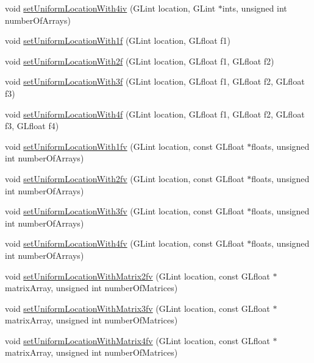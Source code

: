 \begin{DoxyCompactItemize}
\item 
void \hyperlink{classGLProgram_a8d7620f14405cd3fb99d83886ef15775}{set\+Uniform\+Location\+With4iv} (G\+Lint location, G\+Lint $\ast$ints, unsigned int number\+Of\+Arrays)
\item 
void \hyperlink{classGLProgram_a1ad9ce5ccc8d957fe9e01d71ce9560f2}{set\+Uniform\+Location\+With1f} (G\+Lint location, G\+Lfloat f1)
\item 
void \hyperlink{classGLProgram_a3b762779b30cea82590314538843db9a}{set\+Uniform\+Location\+With2f} (G\+Lint location, G\+Lfloat f1, G\+Lfloat f2)
\item 
void \hyperlink{classGLProgram_a33e41cd80fb48e0a57b471f35169783a}{set\+Uniform\+Location\+With3f} (G\+Lint location, G\+Lfloat f1, G\+Lfloat f2, G\+Lfloat f3)
\item 
void \hyperlink{classGLProgram_aae6350415e7f86969daa6de160859cf3}{set\+Uniform\+Location\+With4f} (G\+Lint location, G\+Lfloat f1, G\+Lfloat f2, G\+Lfloat f3, G\+Lfloat f4)
\item 
void \hyperlink{classGLProgram_adeb93361bb46fed7496618d46cd2c176}{set\+Uniform\+Location\+With1fv} (G\+Lint location, const G\+Lfloat $\ast$floats, unsigned int number\+Of\+Arrays)
\item 
void \hyperlink{classGLProgram_a5b6c67eea6ef5f03383d228fb8900a44}{set\+Uniform\+Location\+With2fv} (G\+Lint location, const G\+Lfloat $\ast$floats, unsigned int number\+Of\+Arrays)
\item 
void \hyperlink{classGLProgram_a0df23e97019d9c292a8068bb448f05e3}{set\+Uniform\+Location\+With3fv} (G\+Lint location, const G\+Lfloat $\ast$floats, unsigned int number\+Of\+Arrays)
\item 
void \hyperlink{classGLProgram_a1ec5c5f3d024757f9c35e4bff362a3ee}{set\+Uniform\+Location\+With4fv} (G\+Lint location, const G\+Lfloat $\ast$floats, unsigned int number\+Of\+Arrays)
\item 
void \hyperlink{classGLProgram_a088e08492735e31f94ae29161f6e02d0}{set\+Uniform\+Location\+With\+Matrix2fv} (G\+Lint location, const G\+Lfloat $\ast$matrix\+Array, unsigned int number\+Of\+Matrices)
\item 
void \hyperlink{classGLProgram_a9a9ffe60dcf17ff4fa75d838117f4e93}{set\+Uniform\+Location\+With\+Matrix3fv} (G\+Lint location, const G\+Lfloat $\ast$matrix\+Array, unsigned int number\+Of\+Matrices)
\item 
void \hyperlink{classGLProgram_a3b6a91383721692fe73f316454325fd7}{set\+Uniform\+Location\+With\+Matrix4fv} (G\+Lint location, const G\+Lfloat $\ast$matrix\+Array, unsigned int number\+Of\+Matrices)

\end{DoxyCompactItemize}
